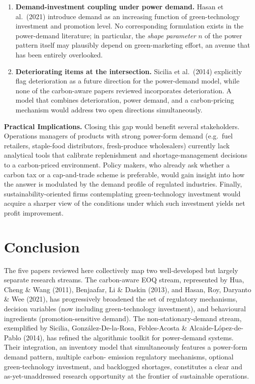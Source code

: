 \documentclass[11pt,a4paper]{article}
\begin{document}
\begin{enumerate}[label=\textbf{G\arabic*.},leftmargin=2.4em,itemsep=0.4em]
\item \textbf{Demand-investment coupling under power demand.}
Hasan et al.\ (2021) introduce demand as an increasing function of
green-technology investment and promotion level. No corresponding
formulation exists in the power-demand literature; in particular, the
\emph{shape parameter} $n$ of the power pattern itself may plausibly
depend on green-marketing effort, an avenue that has been entirely
overlooked.

\item \textbf{Deteriorating items at the intersection.} Sicilia et al.\
(2014) explicitly flag deterioration as a future direction for the
power-demand model, while none of the carbon-aware papers reviewed
incorporates deterioration. A model that combines deterioration, power
demand, and a carbon-pricing mechanism would address two open
directions simultaneously.

\end{enumerate}

\noindent\textbf{Practical Implications.}\;
Closing this gap would benefit several stakeholders. Operations managers
of products with strong power-form demand (e.g.\ fuel retailers,
staple-food distributors, fresh-produce wholesalers) currently lack
analytical tools that calibrate replenishment and shortage-management
decisions to a carbon-priced environment. Policy makers, who already
ask whether a carbon tax or a cap-and-trade scheme is preferable, would
gain insight into how the answer is modulated by the demand profile of
regulated industries. Finally, sustainability-oriented firms
contemplating green-technology investment would acquire a sharper view of
the conditions under which such investment yields net profit improvement.

\section{Conclusion}

The five papers reviewed here collectively map two well-developed but
largely separate research streams. The carbon-aware EOQ stream,
represented by Hua, Cheng \& Wang (2011), Benjaafar, Li \& Daskin
(2013), and Hasan, Roy, Daryanto \& Wee (2021), has progressively
broadened the set of regulatory mechanisms, decision variables (now
including green-technology investment), and behavioural ingredients
(promotion-sensitive demand). The non-stationary-demand stream,
exemplified by Sicilia, Gonz\'alez-De-la-Rosa, Febles-Acosta \&
Alcaide-L\'opez-de-Pablo (2014), has refined the algorithmic toolkit
for power-demand systems. Their integration, an inventory model that
simultaneously features a power-form demand pattern, multiple carbon-
emission regulatory mechanisms, optional green-technology investment,
and backlogged shortages, constitutes a clear and as-yet-unaddressed
research opportunity at the frontier of sustainable operations.
\end{document}
